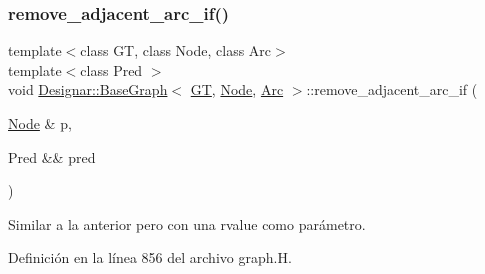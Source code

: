\mbox{\label{class_designar_1_1_base_graph_a10423075ea81c629e88974fa882ec903}} 
\subsubsection{\texorpdfstring{remove\+\_\+adjacent\+\_\+arc\+\_\+if()}{remove\_adjacent\_arc\_if()}\hspace{0.1cm}{\footnotesize\ttfamily [2/2]}}
{\footnotesize\ttfamily template$<$class GT, class Node, class Arc$>$ \\
template$<$class Pred $>$ \\
void \hyperlink{class_designar_1_1_base_graph}{Designar\+::\+Base\+Graph}$<$ \hyperlink{demo-buildgraph_8_c_a3001c40d2c31ca87ed96cd7d1334a55e}{GT}, \hyperlink{namespace_designar_a5af326c65aa2bd26b26c410f2030d09e}{Node}, \hyperlink{namespace_designar_a3f55fb5513d62ff47cbc8f72b8e95d6f}{Arc} $>$\+::remove\+\_\+adjacent\+\_\+arc\+\_\+if (\begin{DoxyParamCaption}\item[{\hyperlink{namespace_designar_a5af326c65aa2bd26b26c410f2030d09e}{Node} \&}]{p,  }\item[{Pred \&\&}]{pred }\end{DoxyParamCaption})\hspace{0.3cm}{\ttfamily [inline]}}



Similar a la anterior pero con una rvalue como parámetro. 



Definición en la línea 856 del archivo graph.\+H.

\mbox{\label{class_designar_1_1_base_graph_a9c97f2759a2847e61e17dc2806172758}} 
